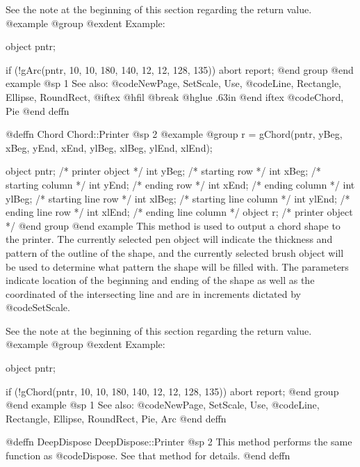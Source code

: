 See the note at the beginning of this section regarding the return value.
@example
@group
@exdent Example:

object  pntr;

if (!gArc(pntr, 10, 10, 180, 140, 12, 12, 128, 135))
        abort report;
@end group
@end example
@sp 1
See also:  @code{NewPage, SetScale, Use,}
        @code{Line, Rectangle, Ellipse, RoundRect,}
@iftex
@hfil @break @hglue .63in 
@end iftex
@code{Chord, Pie}
@end deffn












@deffn {Chord} Chord::Printer
@sp 2
@example
@group
r = gChord(pntr, yBeg, xBeg, yEnd, xEnd,
                 ylBeg, xlBeg, ylEnd, xlEnd);

object  pntr;   /*  printer object         */
int     yBeg;   /*  starting row           */
int     xBeg;   /*  starting column        */
int     yEnd;   /*  ending row             */
int     xEnd;   /*  ending column          */
int     ylBeg;  /*  starting line row      */
int     xlBeg;  /*  starting line column   */
int     ylEnd;  /*  ending line row        */
int     xlEnd;  /*  ending line column     */
object  r;      /*  printer object         */
@end group
@end example
This method is used to output a chord shape to the printer.  The
currently selected pen object will indicate the thickness and pattern of
the outline of the shape, and the currently selected brush object will
be used to determine what pattern the shape will be filled with.  The
parameters indicate location of the beginning and ending of the shape as
well as the coordinated of the intersecting line and are in increments
dictated by @code{SetScale}.

See the note at the beginning of this section regarding the return value.
@example
@group
@exdent Example:

object  pntr;

if (!gChord(pntr, 10, 10, 180, 140, 12, 12, 128, 135))
        abort report;
@end group
@end example
@sp 1
See also:  @code{NewPage, SetScale, Use,}
        @code{Line, Rectangle, Ellipse, RoundRect, Pie, Arc}
@end deffn








@deffn {DeepDispose} DeepDispose::Printer
@sp 2
This method performs the same function as @code{Dispose}.  See that
method for details.
@end deffn





